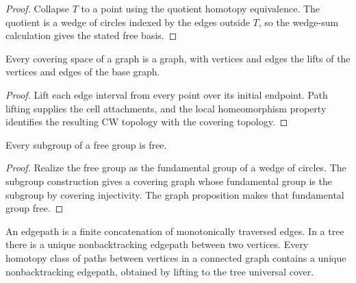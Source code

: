 \begin{proof}
\sketch Collapse $T$ to a point using the quotient homotopy equivalence. The
quotient is a wedge of circles indexed by the edges outside $T$, so the
wedge-sum calculation gives the stated free basis.
\end{proof}

\begin{lemma}
\label{lem:covering-space-of-graph-is-graph}

Every covering space of a graph is a graph, with vertices and edges the lifts
of the vertices and edges of the base graph.
\end{lemma}

\begin{proof}
\sketch Lift each edge interval from every point over its initial endpoint.
Path lifting supplies the cell attachments, and the local homeomorphism
property identifies the resulting CW topology with the covering topology.
\end{proof}

\begin{theorem}
\label{thm:subgroup-of-free-group-is-free}


Every subgroup of a free group is free.
\end{theorem}

\begin{proof}
\sketch Realize the free group as the fundamental group of a wedge of circles.
The subgroup construction gives a covering graph whose fundamental group is
the subgroup by covering injectivity. The graph proposition makes that
fundamental group free.
\end{proof}

\begin{definition}[Edgepath]
\label{def:edgepath}

An edgepath is a finite concatenation of monotonically traversed edges. In a
tree there is a unique nonbacktracking edgepath between two vertices. Every
homotopy class of paths between vertices in a connected graph contains a
unique nonbacktracking edgepath, obtained by lifting to the tree universal
cover.
\end{definition}

